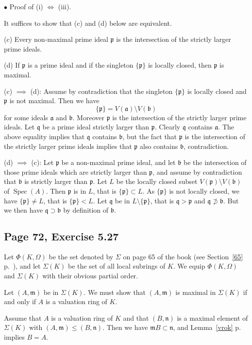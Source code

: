 \documentclass[parskip=half,fontsize=12pt]{scrartcl}%
\newcommand{\mf}{\mathfrak}
\newcommand{\aaa}{\mf a}
\newcommand{\bbb}{\mf b}
\newcommand{\mmm}{\mf m}
\newcommand{\nnn}{\mf n}
\newcommand{\ppp}{\mf p}
\newcommand{\qqq}{\mf q}
\newcommand{\bu}{\bullet}
\newcommand{\Spec}{\operatorname{Spec}}\newcommand{\Sp}{\operatorname{Spec}}
\begin{document}
$\bu$ Proof of (i) $\iff$ (iii). 

It suffices to show that (c) and (d) below are equivalent.

(c) Every non-maximal prime ideal $\ppp$ is the intersection of the strictly larger prime ideals.

(d) If $\ppp$ is a prime ideal and if the singleton $\{\ppp\}$ is locally closed, then $\ppp$ is maximal.

(c) $\implies$ (d): Assume by contradiction that the singleton $\{\ppp\}$ is locally closed and $\ppp$ is not maximal. Then we have 
$$
\{\ppp\}=V(\aaa)\setminus V(\bbb)
$$ 
for some ideals $\aaa$ and $\bbb$. Moreover $\ppp$ is the intersection of the strictly larger prime ideals. Let $\qqq$ be a prime ideal strictly larger than $\ppp$. Clearly $\qqq$ contains $\aaa$. The above equality implies that $\qqq$ contains $\bbb$, but the fact that $\ppp$ is the intersection of the strictly larger prime ideals implies that $\ppp$ also contains $\bbb$, contradiction.

(d) $\implies$ (c): Let $\ppp$ be a non-maximal prime ideal, and let $\bbb$ be the intersection of those prime ideals which are strictly larger than $\ppp$, and assume by contradiction that $\bbb$ is strictly larger than $\ppp$. Let $L$ be the locally closed subset $V(\ppp)\setminus V(\bbb)$ of $\Spec(A)$. Then $\ppp$ is in $L$, that is $\{\ppp\}\subset L$. As $\{\ppp\}$ is not locally closed, we have $\{\ppp\}\ne L$, that is $\{\ppp\}<L$. Let $\qqq$ be in $L\setminus\{\ppp\}$, that is $\qqq>\ppp$ and $\qqq\not\supset\bbb$. But we then have $\qqq\supset\bbb$ by definition of $\bbb$. 

\subsection{Page 72, Exercise 5.27}%

Let $\Phi(K,\Omega)$ be the set denoted by $\Sigma$ on page 65 of the book (see Section~\ref{65} p.~\pageref{65}), and let $\Sigma(K)$ be the set of all local subrings of $K$. We equip $\Phi(K,\Omega)$ and $\Sigma(K)$ with their obvious partial order.

Let $(A,\mmm)$ be in $\Sigma(K)$. We must show that $(A,\mmm)$ is maximal in $\Sigma(K)$ if and only if $A$ is a valuation ring of $K$.

Assume that $A$ is a valuation ring of $K$ and that $(B,\nnn)$ is a maximal element of $\Sigma(K)$ with $(A,\mmm)\le(B,\nnn)$. Then we have $\mmm B\subset\nnn$, and Lemma~\ref{vrok} p.~\pageref{vrok} implies $B=A$. %
\end{document}
